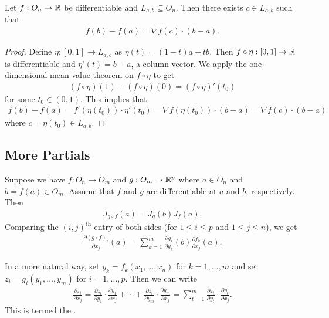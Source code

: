 \begin{theorem}
    Let $f:O_{n} \to \mathbb{R}$ be differentiable and $L_{a,b} \subseteq O_{n}$. Then there exists $c \in L_{a,b}$ such that
    \begin{align}
        f(b)-f(a) = \nabla f(c) \cdot (b-a).
    \end{align}
\end{theorem}

\begin{proof}
    Define $\eta:[0,1] \to L_{a,b}$ as $\eta(t) = (1-t)a + tb$. Then $f \circ \eta : [0,1] \to \mathbb{R}$ is differentiable and $\eta'(t) = b-a$, a column vector. We apply the one-dimensional mean value theorem on $f \circ \eta$ to get
    \begin{align}
        (f \circ \eta)(1) - (f \circ \eta)(0) = (f \circ \eta)'(t_{0})
    \end{align}
    for some $t_{0} \in (0,1)$. This implies that
    \begin{align}
        f(b) - f(a) = f'(\eta(t_{0})) \cdot \eta'(t_{0}) = \nabla f(\eta(t_{0})) \cdot (b-a) = \nabla f(c) \cdot (b-a)
    \end{align}
    where $c = \eta(t_{0}) \in L_{a,b}$.
\end{proof}

\subsection{More Partials}
Suppose we have $f:O_{n} \to O_{m}$ and $g:O_{m} \to \mathbb{R}^{p}$ where $a \in O_{n}$ and $b = f(a) \in O_{m}$. Assume that $f$ and $g$ are differentiable at $a$ and $b$, respectively. Then 
\begin{align}
    J_{g \circ f}(a) = J_{g}(b)J_{f}(a).
\end{align}
Comparing the $(i,j)^{\text{th}}$ entry of both sides (for $1 \leq i \leq p$ and $1 \leq j \leq n$), we get
\begin{align}
    \frac{\partial (g \circ f)_{i}}{\partial x_{j}}(a) = \sum_{k=1}^{m} \frac{\partial g_{i}}{\partial y_{k}}(b) \frac{\partial f_{k}}{\partial x_{j}}(a).
\end{align}

In a more natural way, set $y_{k} = f_{k}(x_{1},\ldots,x_{n})$ for $k = 1,\ldots,m$ and set $z_{i} = g_{i}(y_{1},\ldots,y_{m})$ for $i = 1,\ldots,p$. Then we can write
\begin{align}
    \frac{\partial z_{i}}{\partial x_{j}} = \frac{\partial z_{i}}{\partial y_{1}} \cdot \frac{\partial y_{1}}{\partial x_{j}} + \cdots + \frac{\partial z_{i}}{\partial y_{m}} \cdot \frac{\partial y_{m}}{\partial x_{j}} = \sum_{t = 1}^{m} \frac{\partial z_{i}}{\partial y_{t}} \cdot \frac{\partial y_{t}}{\partial x_{j}}.
\end{align}
This is termed the .

